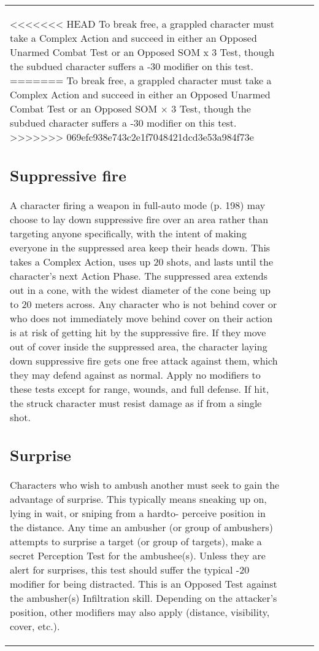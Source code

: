 \begin{table}
\begin{tabular}{|p{8cm}|r|r|r|}
<<<<<<< HEAD To break free, a grappled character must take a Complex Action and succeed in either an Opposed Unarmed Combat Test or an Opposed SOM x 3 Test, though the subdued character suffers a -30 modifier on this test. ======= To break free, a grappled character must take a Complex Action and succeed in either an Opposed Unarmed Combat Test or an Opposed SOM $\times$ 3 Test, though the subdued character suffers a -30 modifier on this test. >>>>>>> 069efc938e743c2e1f7048421dcd3e53a984f73e 



\subsection{Suppressive fire} \label{sec:suppressive-fire} 

A character firing a weapon in full-auto mode (p. 198) may choose to lay down suppressive fire over an area rather than targeting anyone specifically, with the intent of making everyone in the suppressed area keep their heads down. This takes a Complex Action, uses up 20 shots, and lasts until the character’s next Action Phase. The suppressed area extends out in a cone, with the widest diameter of the cone being up to 20 meters across. Any character who is not behind cover or who does not immediately move behind cover on their action is at risk of getting hit by the suppressive fire. If they move out of cover inside the suppressed area, the character laying down suppressive fire gets one free attack against them, which they may defend against as normal. Apply no modifiers to these tests except for range, wounds, and full defense. If hit, the struck character must resist damage as if from a single shot. 



\subsection{Surprise} \label{sec:surprise} 

Characters who wish to ambush another must seek to gain the advantage of surprise. This typically means sneaking up on, lying in wait, or sniping from a hardto- perceive position in the distance. Any time an ambusher (or group of ambushers) attempts to surprise a target (or group of targets), make a secret Perception Test for the ambushee(s). Unless they are alert for surprises, this test should suffer the typical -20 modifier for being distracted. This is an Opposed Test against the ambusher(s) Infiltration skill. Depending on the attacker’s position, other modifiers may also apply (distance, visibility, cover, etc.). 


\end{tabular}
\end{table}
